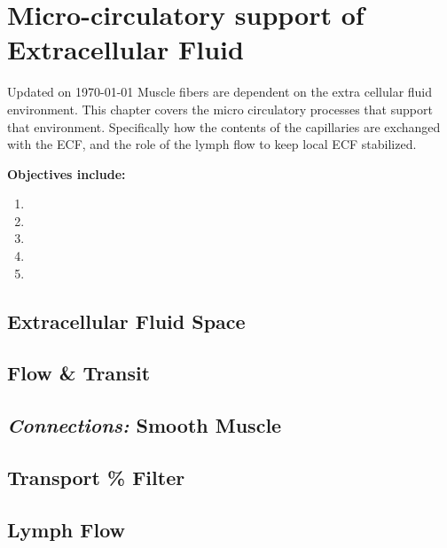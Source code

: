 \chapter{Micro-circulatory support of Extracellular Fluid}\label{chp:ecf_microcirculation}
Updated on \today
\minitoc
Muscle fibers are dependent on the extra cellular fluid environment. This chapter covers the micro circulatory processes that support that environment. Specifically how the contents of the capillaries are exchanged with the ECF, and the role of the lymph flow to keep local ECF stabilized.

\vspace{5mm}

\textbf{Objectives include:}
\begin{enumerate}
    \item
    \item
    \item
    \item
    \item
\end{enumerate}

\section{Extracellular Fluid Space}

\section{Flow \& Transit}

\section{\textit{Connections:} Smooth Muscle}

\section{Transport \% Filter}

\section{Lymph Flow}

\printbibliography[heading=subbibintoc]

